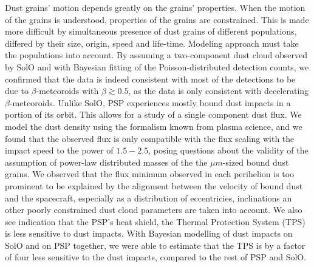 Dust grains' motion depends greatly on the grains' properties. When the motion of the grains is understood, properties of the grains are constrained. This is made more difficult by simultaneous presence of dust grains of different populations, differed by their size, origin, speed and life-time. Modeling approach must take the populations into account. By assuming a two-component dust cloud observed by SolO and with Bayesian fitting of the Poisson-distributed detection counts, we confirmed that the data is indeed consistent with most of the detections to be due to $\beta$-meteoroids with $\beta\gtrsim 0.5$, as the data is only consistent with decelerating $\beta$-meteoroids. Unlike SolO, PSP experiences mostly bound dust impacts in a portion of its orbit. This allows for a study of a single component dust flux. We model the dust density using the formalism known from plasma science, and we found that the observed flux is only compatible with the flux scaling with the impact speed to the power of $1.5 - 2.5$, posing questions about the validity of the assumption of power-law distributed masses of the the $\mu m$-sized bound dust grains. We observed that the flux minimum observed in each perihelion is too prominent to be explained by the alignment between the velocity of bound dust and the spacecraft, especially as a distribution of eccentricies, inclinations an other poorly constrained dust cloud parameters are taken into account. We also see indication that the PSP's heat shield, the Thermal Protection System (TPS) is less sensitive to dust impacts. With Bayesian modelling of dust impacts on SolO and on PSP together, we were able to estimate that the TPS is by a factor of four less sensitive to the dust impacts, compared to the rest of PSP and SolO. 